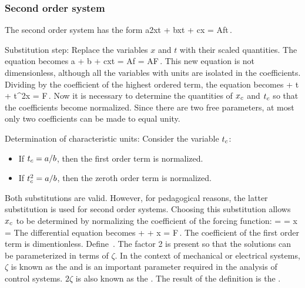 \subsubsection{Second order system}
The second order system has the form
\beq
a\nxod 2xt + b\xod xt + cx = Af\vat t\,.
\eeq

Substitution step: Replace the variables $x$ and $t$ with their scaled quantities. The equation becomes
\beq
a
  + b
  + c\chpq x\scpq t
  = Af 
  = AF\,.
\eeq
This new equation is not dimensionless, although all the variables with units are isolated in the coefficients. Dividing by the coefficient of the highest ordered term, the equation becomes
\beq
{}
  + \chpq t 
  + \chpq t^2\scpq x
  = F\,.
\eeq
Now it is necessary to determine the quantities of ${x}_{c}$ and ${t}_{c}$ so that the coefficients become normalized. Since there are two free parameters, at most only two coefficients can be made to equal unity.

Determination of characteristic units: Consider the variable ${t}_{c}$:
\begin{itemize}
\item If ${t}_{c} = a/b$, then the first order term is normalized.
\item If ${t}_{c}^2 = a/b$, then the zeroth order term is normalized.
\end{itemize}
Both substitutions are valid. However, for pedagogical reasons, the latter substitution is used for second order systems. Choosing this substitution allows ${x}_{c}$ to be determined by normalizing the coefficient of the forcing function:
 =  = \implies \chpq x = 
\eeq
The differential equation becomes
\beq
{} +  + \scpq x = F\,.
\eeq
The coefficient of the first order term is dimentionless. Define
\zeta {} {}\,.
\eeq
The factor 2 is present so that the solutions can be parameterized in terms of $\zeta$. In the context of mechanical or electrical systems, $\zeta$ is known as the  and is an important parameter required in the analysis of control systems. $2\zeta$ is also known as the . The result of the definition is the .


